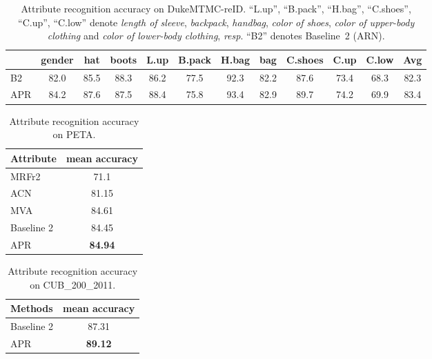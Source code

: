 \documentclass[5p,times,twocolumn]{elsarticle}
\begin{document}
    \setlength{\tabcolsep}{3.5pt}
    \begin{table*}[!t]
\small
        \caption{Attribute recognition accuracy on DukeMTMC-reID. ``L.up'', ``B.pack'', ``H.bag'', ``C.shoes'', ``C.up'', ``C.low'' denote \emph{length of sleeve}, \emph{backpack}, \emph{handbag}, \emph{color of shoes}, \emph{color of upper-body clothing} and \emph{color of lower-body clothing}, \emph{resp}. ``B2'' denotes Baseline~2 (ARN).}
        \renewcommand{\arraystretch}{1.0}
        \begin{center}
            \begin{tabular}{l|cccccccccc|c}
                \hline
                &gender & hat&boots &L.up &B.pack&H.bag&bag&C.shoes&C.up&C.low& Avg\\
                \hline
                B2 &82.0& 85.5 &88.3&86.2&77.5&92.3&82.2&87.6&73.4&68.3 &82.3\\
                APR &84.2&87.6&87.5&88.4&75.8&93.4&82.9& 89.7& 74.2&69.9&83.4\\
                \hline
            \end{tabular}
            \label{table:compare_att_DukeMTMC-reID}
        \end{center}
    \end{table*}
    
    
\setlength{\tabcolsep}{14pt}
\begin{table}[!htb]
   \caption{Attribute recognition accuracy on PETA.}
   \vspace{-4mm}
    \begin{center}
        \small
        \begin{tabular}{l|c}
            \hline
            Attribute & mean accuracy\\
            \hline
            MRFr2 \cite{deng2014pedestrian}&71.1\\
            ACN \cite{sudowe2015person}&81.15\\
            MVA \cite{schumann2017person}&84.61\\
            \hline
            Baseline 2&84.45\\
            APR& \textbf{84.94}\\
            \hline
        \end{tabular}
    \end{center}
    \label{table:peta2}
\end{table}
    
    \setlength{\tabcolsep}{14pt}
\begin{table}[!htb]
    \caption{Attribute recognition accuracy on CUB\_200\_2011.}
    \vspace{-4mm}
    \begin{center}
        \small
        \begin{tabular}{l|c}
            \hline
            Methods & mean accuracy \\
            \hline
            Baseline 2 &87.31 \\
            APR&\textbf{89.12} \\
            \hline
        \end{tabular}
    \end{center}
    \label{table:cub2}
\end{table}
    
\end{document}
